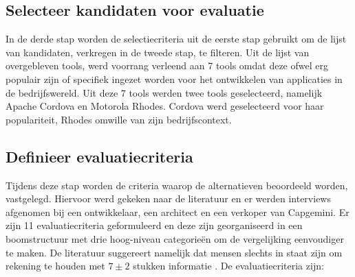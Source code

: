 \documentclass[a4paper]{IEEEconf}
\begin{document}
\subsection{Selecteer kandidaten voor evaluatie}

In de derde stap worden de selectiecriteria uit de eerste stap gebruikt om de lijst van kandidaten, verkregen in de tweede stap, te filteren. Uit de lijst van overgebleven tools, werd voorrang verleend aan 7 tools omdat deze ofwel erg populair zijn of specifiek ingezet worden voor het ontwikkelen van applicaties in de bedrijfswereld. Uit deze 7 tools werden twee tools geselecteerd, namelijk Apache Cordova en Motorola Rhodes. Cordova werd geselecteerd voor haar populariteit, Rhodes omwille van zijn bedrijfscontext.

\subsection{Definieer evaluatiecriteria}

Tijdens deze stap worden de criteria waarop de alternatieven beoordeeld worden, vastgelegd. Hiervoor werd gekeken naar de literatuur \cite{Gartner:CPT:2011, VMCPT:2012} en er werden interviews afgenomen bij een ontwikkelaar, een architect en een verkoper van Capgemini. Er zijn 11 evaluatiecriteria geformuleerd en deze zijn georganiseerd in een boomstructuur met drie hoog-niveau categorie\"en om de vergelijking eenvoudiger te maken. De literatuur suggereert namelijk dat mensen slechts in staat zijn om rekening te houden met $7 \pm 2$ stukken informatie \cite{Miller:1956}. De evaluatiecriteria zijn:
\end{document}
